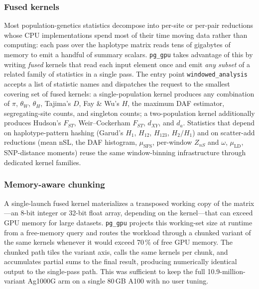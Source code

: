 \documentclass[12pt]{article}
\newcommand{\pggpu}{\texttt{pg\_gpu}\xspace}
\begin{document}

\subsubsection*{Fused kernels}

Most population-genetics statistics decompose into per-site or per-pair
reductions whose CPU implementations spend most of their time moving
data rather than computing: each pass over the haplotype matrix reads
tens of gigabytes of memory to emit a handful of summary scalars.
\pggpu takes advantage of this by writing \emph{fused} kernels that
read each input element once and emit \emph{any subset} of a related
family of statistics in a single pass. The entry point \texttt{windowed\_analysis}
accepts a list of statistic names and dispatches the request to the
smallest covering set of fused kernels: a single-population kernel
produces any combination of $\pi$, $\theta_W$, $\theta_H$, Tajima's
$D$, Fay \& Wu's $H$, the maximum DAF estimator, segregating-site
counts, and singleton counts; a two-population kernel additionally
produces Hudson's $F_{ST}$, Weir--Cockerham $F_{ST}$, $d_{XY}$, and
$d_a$. Statistics that depend on haplotype-pattern hashing (Garud's
$H_1$, $H_{12}$, $H_{123}$, $H_2/H_1$) and on scatter-add reductions
(mean nSL, the DAF histogram, $\mu_{\mathrm{SFS}}$, per-window $Z_{nS}$
and $\omega$, $\mu_{\mathrm{LD}}$, SNP-distance moments) reuse the same
window-binning infrastructure through dedicated kernel families.

\subsubsection*{Memory-aware chunking}

A single-launch fused kernel materializes a transposed working copy of
the matrix---an 8-bit integer or 32-bit float array, depending on the
kernel---that can exceed GPU memory for large datasets. \pggpu projects
this working-set size at runtime from a free-memory query and routes
the workload through a chunked variant of the same kernels whenever it
would exceed 70\,\% of free GPU memory. The chunked path tiles the
variant axis, calls the same kernels per chunk, and accumulates partial
sums to the final result, producing numerically identical output to the
single-pass path. This was sufficient to keep the full
10.9-million-variant Ag1000G arm on a single 80\,GB A100 with no user
tuning.
\end{document}
